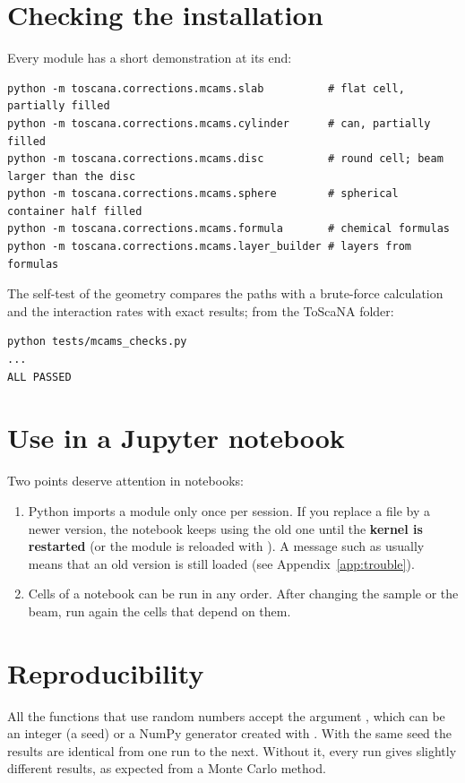 \section{Checking the installation}

Every module has a short demonstration at its end:
\begin{lstlisting}[style=shell]
python -m toscana.corrections.mcams.slab          # flat cell, partially filled
python -m toscana.corrections.mcams.cylinder      # can, partially filled
python -m toscana.corrections.mcams.disc          # round cell; beam larger than the disc
python -m toscana.corrections.mcams.sphere        # spherical container half filled
python -m toscana.corrections.mcams.formula       # chemical formulas
python -m toscana.corrections.mcams.layer_builder # layers from formulas
\end{lstlisting}
The self-test of the geometry compares the paths with a brute-force calculation and the interaction rates
with exact results; from the ToScaNA folder:
\begin{lstlisting}[style=shell]
python tests/mcams_checks.py
...
ALL PASSED
\end{lstlisting}

\section{Use in a Jupyter notebook}

Two points deserve attention in notebooks:
\begin{enumerate}
  \item Python imports a module only once per session. If you replace a file by a newer version, the notebook
        keeps using the old one until the \textbf{kernel is restarted} (or the module is reloaded with
        ). A message such as 
        usually means that an old version is still loaded (see Appendix~\ref{app:trouble}).
  \item Cells of a notebook can be run in any order. After changing the sample or the beam, run again the cells that depend on them.
\end{enumerate}

\section{Reproducibility}

All the functions that use random numbers accept the argument , which can be an integer
(a seed) or a NumPy generator created with . With the same seed the
results are identical from one run to the next. Without it, every run gives slightly different
results, as expected from a Monte Carlo method.

